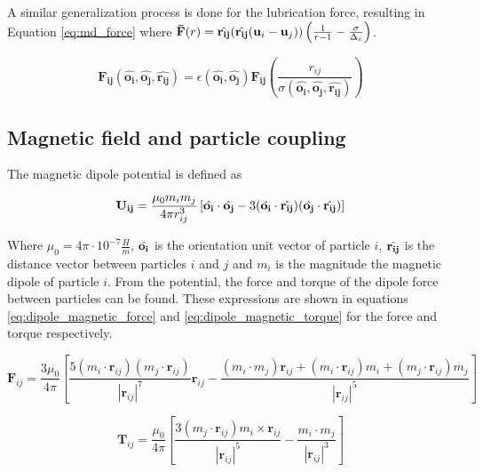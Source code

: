 A similar generalization process is done for the lubrication force, resulting in Equation \ref{eq:md_force} where 
$\mathbf{\Bar{F}}(r) = \hat{\mathbf{r_{ij}}}(\hat{\mathbf{r_{ij}}}(\mathbf{u}_i - \mathbf{u}_j))\left( \frac{1}{r - 1} - 
\frac{\sigma}{\Delta_{c}} \right)$. 

\begin{equation}
    \mathbf{F_{ij}}(\hat{\mathbf{o_i}}, \hat{\mathbf{o_j}}, \hat{\mathbf{r_{ij}}}) = \epsilon(\hat{\mathbf{o_i}}, 
    \hat{\mathbf{o_j}})\mathbf{\mathbf{F_{ij}}}\left( \frac{r_{ij}}{\sigma(\hat{\mathbf{o_i}}, \hat{\mathbf{o_j}}, 
    \hat{\mathbf{r_{ij}}})} \right)
    \label{eq:md_force}
\end{equation}

\subsection{Magnetic field and particle coupling}
\label{section:lbm_colloids_magnetics}

The magnetic dipole potential is defined as

\begin{equation}
    \mathbf{U_{ij}} = \frac{\mu_0 m_i m_j}{4\pi r_{ij}^{3}} \left[ \Hat{\mathbf{o_i}} \cdot \Hat{\mathbf{o_j}} - 
    3(\Hat{\mathbf{o_i}} \cdot \Hat{\mathbf{r_{ij}}})(\Hat{\mathbf{o_j}} \cdot \Hat{\mathbf{r_{ij}}}) \right]
    \label{eq:magnet_potential}
\end{equation}

Where $\mu_0 = 4\pi \cdot 10^{-7} \frac{H}{m}$,  $\Hat{\mathbf{o_i}}$ is the orientation unit vector of particle 
$i$, $\Hat{\mathbf{r_{ij}}}$ is the distance vector between particles $i$ and $j$ and $m_i$ is the magnitude the 
magnetic dipole of particle $i$. From the potential, the force and torque of the dipole force between particles 
can be found. These expressions are shown in equations \ref{eq:dipole_magnetic_force} and \ref{eq:dipole_magnetic_torque} 
for the force and torque respectively.

\begin{equation}
    \mathbf{F}_{ij} = \frac{3 \mu_0}{4 \pi} [\frac{5(m_i \cdot \mathbf{r}_{ij})(m_j 
    \cdot \mathbf{r}_{ij})}{|\mathbf{r}_{ij}|^7}\mathbf{r}_{ij} - \frac{(m_i \cdot m_{j})\mathbf{r}_{ij} + 
    (m_i \cdot \mathbf{r}_{ij})m_i + (m_j \cdot \mathbf{r}_{ij})m_j }{|\mathbf{r}_{ij}|^5}]
\label{eq:dipole_magnetic_force}
\end{equation}

\begin{equation}
    \mathbf{T}_{ij} = \frac{\mu_0}{4 \pi}[ \frac{3(m_j \cdot \mathbf{r}_{ij})m_i \times \mathbf{r}_{ij} }
    {|\mathbf{r}_{ij}|^5} - \frac{m_i \cdot m_j }{|\mathbf{r}_{ij}|^3} ]
    \label{eq:dipole_magnetic_torque}
\end{equation}

